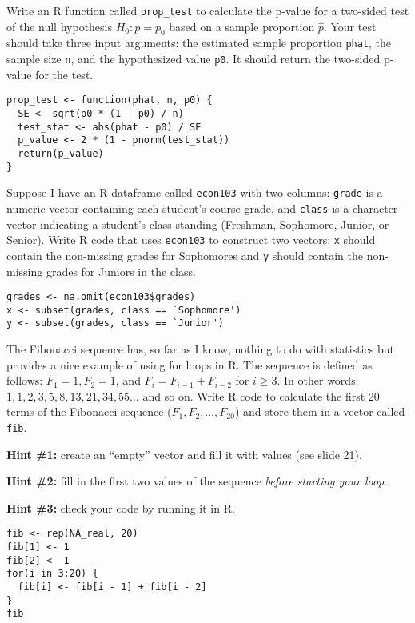 \documentclass[addpoints,12pt]{exam}
\begin{document}
\begin{questions}
\question Write an R function called \texttt{prop\_test} to calculate the p-value for a two-sided test of the null hypothesis $H_0\colon p = p_0$ based on a sample proportion $\widehat{p}$. Your test should take three input arguments: the estimated sample proportion \texttt{phat}, the sample size \texttt{n}, and the hypothesized value \texttt{p0}.
It should return the two-sided p-value for the test.
\begin{solution}
\begin{verbatim}
prop_test <- function(phat, n, p0) {
  SE <- sqrt(p0 * (1 - p0) / n)
  test_stat <- abs(phat - p0) / SE 
  p_value <- 2 * (1 - pnorm(test_stat))
  return(p_value)
}
\end{verbatim}
\end{solution}

\question Suppose I have an R dataframe called \texttt{econ103} with two columns: \texttt{grade} is a numeric vector containing each student's course grade, and \texttt{class} is a character vector indicating a student's class standing (Freshman, Sophomore, Junior, or Senior).
Write R code that uses \texttt{econ103} to construct two vectors: \texttt{x} should contain the non-missing grades for Sophomores and \texttt{y} should contain the non-missing grades for Juniors in the class.
\begin{solution}
\begin{verbatim}
grades <- na.omit(econ103$grades)
x <- subset(grades, class == `Sophomore')
y <- subset(grades, class == `Junior') 
\end{verbatim}
\end{solution}

\question The Fibonacci sequence has, so far as I know, nothing to do with statistics but provides a nice example of using for loops in R. The sequence is defined as follows: $F_1 = 1, F_2 = 1$, and $F_i = F_{i-1} + F_{i-2}$ for $i \geq 3$. In other words: $1, 1, 2, 3, 5, 8, 13, 21, 34, 55\dots$ and so on.
Write R code to calculate the first 20 terms of the Fibonacci sequence ($F_1, F_2, \dots, F_{20}$) and store them in a vector called \texttt{fib}.

\textbf{Hint \#1:} create an ``empty'' vector and fill it with values (see slide 21). 

\textbf{Hint \#2:} fill in the first two values of the sequence \emph{before starting your loop}.

\textbf{Hint \#3:} check your code by running it in R.
\begin{solution}
  \begin{verbatim}
fib <- rep(NA_real, 20)
fib[1] <- 1
fib[2] <- 1
for(i in 3:20) {
  fib[i] <- fib[i - 1] + fib[i - 2]
}
fib
  \end{verbatim}
\end{solution}




\end{questions}
\end{document}
